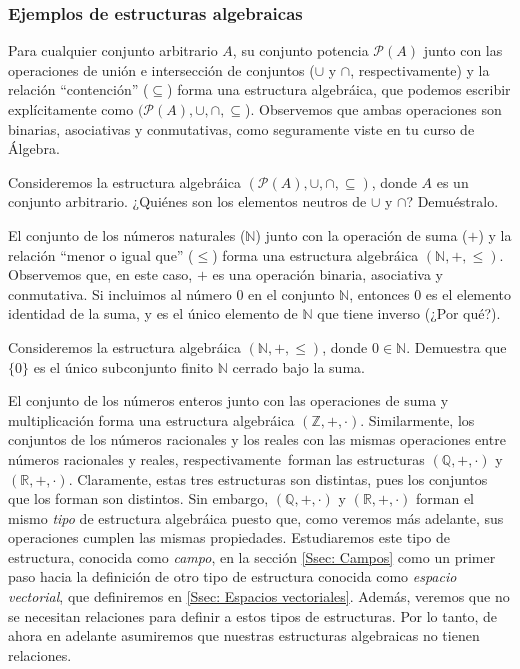 \documentclass[apuntes]{subfiles}
\begin{document}
\subsubsection*{Ejemplos de estructuras algebraicas} \label{Sssec: Ejemplos de estructuras algebráicas}

Para cualquier conjunto arbitrario $A$, su conjunto potencia $\mathscr{P}(A)$ junto con las operaciones de unión e intersección de conjuntos ($\cup$ y $\cap$, respectivamente) y la relación ``contención'' ($\subseteq$) forma una estructura algebráica, que podemos escribir explícitamente como $(\mathscr{P}(A),\cup,\cap,\subseteq$). Observemos que ambas operaciones son binarias, asociativas y conmutativas, como seguramente viste en tu curso de Álgebra.

\begin{ejer}\label{ejercicio-1}
    Consideremos la estructura algebráica $(\mathscr{P}(A),\cup,\cap,\subseteq)$, donde $A$ es un conjunto arbitrario. ¿Quiénes son los elementos neutros de $\cup$ y $\cap$? Demuéstralo.
\end{ejer}

El conjunto de los números naturales ($\mathbb{N}$) junto con la operación de suma ($+$) y la relación ``menor o igual que'' ($\le$) forma una estructura algebráica $(\mathbb{N},+,\le)$. Observemos que, en este caso, $+$ es una operación binaria, asociativa y conmutativa. Si incluimos al número $0$ en el conjunto $\mathbb{N}$, entonces $0$ es el elemento identidad de la suma, y es el único elemento de $\mathbb{N}$ que tiene inverso (¿Por qué?).

\begin{ejer}\label{ejercicio-2}
    Consideremos la estructura algebráica $(\mathbb{N},+,\le)$, donde $0\in\mathbb{N}$. Demuestra que $\{0\}$ es el único subconjunto finito $\mathbb{N}$ cerrado bajo la suma.
\end{ejer}

El conjunto de los números enteros junto con las operaciones de suma y multiplicación forma una estructura algebráica $(\mathbb{Z},+,\cdot)$. Similarmente, los conjuntos de los números racionales y los reales con las mismas operaciones \textemdash entre números racionales y reales, respectivamente\textemdash \ forman las estructuras $(\mathbb{Q},+,\cdot)$ y $(\mathbb{R},+,\cdot)$. Claramente, estas tres estructuras son distintas, pues los conjuntos que los forman son distintos. Sin embargo, $(\mathbb{Q},+,\cdot)$ y $(\mathbb{R},+,\cdot)$ forman el mismo \emph{tipo} de estructura algebráica puesto que, como veremos más adelante, sus operaciones cumplen las mismas propiedades. Estudiaremos este tipo de estructura, conocida como \emph{campo}, en la sección \ref{Ssec: Campos} como un primer paso hacia la definición de otro tipo de estructura conocida como \emph{espacio vectorial}, que definiremos en \ref{Ssec: Espacios vectoriales}. Además, veremos que no se necesitan relaciones para definir a estos tipos de estructuras. Por lo tanto, de ahora en adelante asumiremos que nuestras estructuras algebraicas no tienen relaciones. \\
\end{document}
